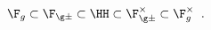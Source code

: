 \begin{equation}
\F_g \subset \F_{\g\pm} \subset \HH \subset \F^\times_{\g\pm} \subset
	\F^\times_g \;\; .
\label{eq:heirarchy}
\end{equation}

